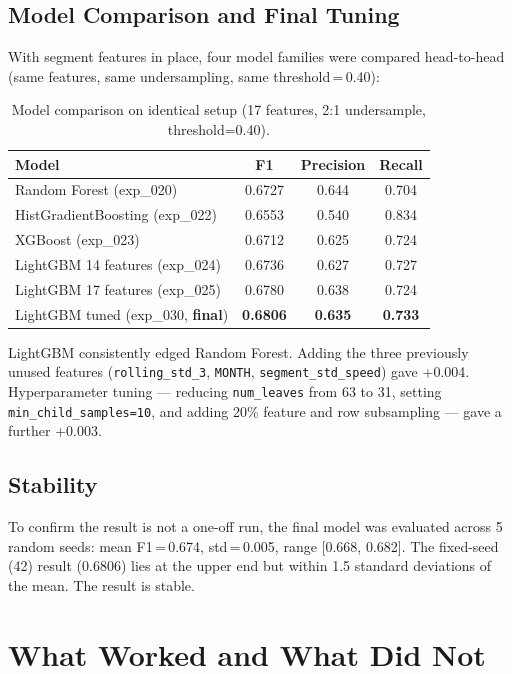 \documentclass{article}
\begin{document}
\subsection{Model Comparison and Final Tuning}

With segment features in place, four model families were compared head-to-head
(same features, same undersampling, same threshold\,=\,0.40):

\begin{table}[h]
\caption{Model comparison on identical setup (17 features, 2:1 undersample, threshold=0.40).}
\label{tab:models}
\centering
\begin{tabular}{lccc}
\toprule
Model & F1 & Precision & Recall \\
\midrule
Random Forest (exp\_020) & 0.6727 & 0.644 & 0.704 \\
HistGradientBoosting (exp\_022) & 0.6553 & 0.540 & 0.834 \\
XGBoost (exp\_023) & 0.6712 & 0.625 & 0.724 \\
LightGBM 14 features (exp\_024) & 0.6736 & 0.627 & 0.727 \\
LightGBM 17 features (exp\_025) & 0.6780 & 0.638 & 0.724 \\
LightGBM tuned (exp\_030, \textbf{final}) & \textbf{0.6806} & \textbf{0.635} & \textbf{0.733} \\
\bottomrule
\end{tabular}
\end{table}

LightGBM consistently edged Random Forest. Adding the three previously unused features
(\texttt{rolling\_std\_3}, \texttt{MONTH}, \texttt{segment\_std\_speed}) gave +0.004.
Hyperparameter tuning — reducing \texttt{num\_leaves} from 63 to 31,
setting \texttt{min\_child\_samples=10}, and adding 20\% feature and row subsampling —
gave a further +0.003.

\subsection{Stability}

To confirm the result is not a one-off run, the final model was evaluated across
5 random seeds: mean F1\,=\,0.674, std\,=\,0.005, range [0.668, 0.682].
The fixed-seed (42) result (0.6806) lies at the upper end but within 1.5 standard
deviations of the mean. The result is stable.

\section{What Worked and What Did Not}
\end{document}

